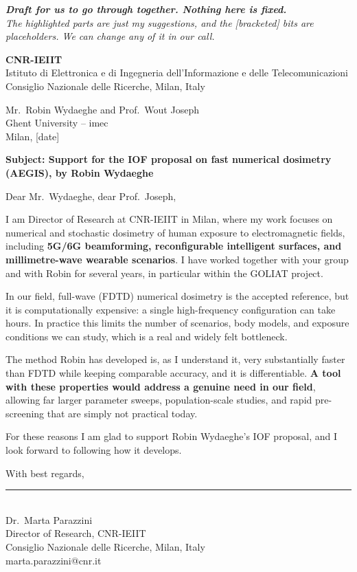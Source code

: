 \documentclass[11pt]{article}
\providecommand{\hl}[1]{\textbf{\textcolor{hlcol}{#1}}}
\begin{document}
\begin{center}\small\itshape
\hl{Draft for us to go through together. Nothing here is fixed.}\\
The highlighted parts are just my suggestions, and the [bracketed] bits are placeholders. We can change any of it in our call.
\end{center}
\bigskip

{\large\textbf{CNR-IEIIT}}\\
Istituto di Elettronica e di Ingegneria dell'Informazione e delle Telecomunicazioni\\
Consiglio Nazionale delle Ricerche, Milan, Italy\\[1.5em]

\begin{flushright}
Mr.\ Robin Wydaeghe and Prof.\ Wout Joseph\\
Ghent University -- imec\\[1em]
Milan, [date]
\end{flushright}

\bigskip
\textbf{Subject: Support for the IOF proposal on fast numerical dosimetry
(\hl{AEGIS}), by Robin Wydaeghe}

\bigskip
Dear Mr.\ Wydaeghe, dear Prof.\ Joseph,

I am Director of Research at CNR-IEIIT in Milan, where my work focuses on numerical and
stochastic dosimetry of human exposure to electromagnetic fields, including \hl{5G/6G
beamforming, reconfigurable intelligent surfaces, and millimetre-wave wearable scenarios}. I
have worked together with your group and with Robin for several years, in particular within
the GOLIAT project.

In our field, full-wave (FDTD) numerical dosimetry is the accepted reference, but it is
computationally expensive: a single high-frequency configuration can take hours. In practice
this limits the number of scenarios, body models, and exposure conditions we can study, which
is a real and widely felt bottleneck.

The method Robin has developed is, as I understand it, very substantially faster than FDTD
while keeping comparable accuracy, and it is differentiable. \hl{A tool with these properties
would address a genuine need in our field}, allowing far larger parameter sweeps,
population-scale studies, and rapid pre-screening that are simply not practical today.

For these reasons I am glad to support Robin Wydaeghe's IOF proposal, and I look forward to
following how it develops.

\bigskip
With best regards,

\vspace{2.2cm}

\rule{6cm}{0.4pt}\\
Dr.\ Marta Parazzini\\
Director of Research, CNR-IEIIT\\
Consiglio Nazionale delle Ricerche, Milan, Italy\\
marta.parazzini@cnr.it
\end{document}
